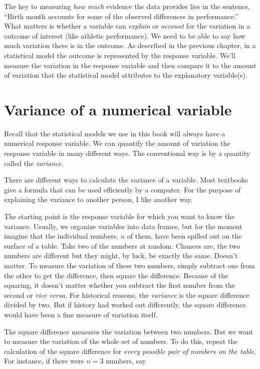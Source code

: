 \documentclass[]{tufte-book}
\begin{document}
The key to measuring \emph{how much} evidence the data provides lies in the sentence, ``Birth month accounts for some of the observed differences in performance.'' What matters is whether a variable can \emph{explain} or \emph{account} for the variation in a outcome of interest (like athletic performance). We need to be able to say how much variation there is in the outcome. As described in the previous chapter, in a statistical model the outcome is represented by the response variable. We'll measure the variation in the response variable and then compare it to the amount of variation that the statistical model attributes to the explanatory variable(s).

\hypertarget{variance-of-a-numerical-variable}{%
\section{Variance of a numerical variable}\label{variance-of-a-numerical-variable}}

Recall that the statistical models we use in this book will always have a numerical response variable. We can quantify the amount of variation the response variable in many different ways. The conventional way is by a quantity called the \emph{variance}.

There are different ways to calculate the variance of a variable. Most textbooks give a formula that can be used efficiently by a computer. For the purpose of explaining the variance to another person, I like another way.

The starting point is the response variable for which you want to know the variance. Usually, we organize variables into data frames, but for the moment imagine that the individual numbers, \(n\) of them, have been spilled out on the surface of a table. Take two of the numbers at random. Chances are, the two numbers are different but they might, by luck, be exactly the same. Doesn't matter. To measure the variation of these two numbers, simply subtract one from the other to get the difference, then square the difference. Because of the squaring, it doesn't matter whether you subtract the first number from the second or \emph{vice versa}. For historical reasons, the \emph{variance} is the square difference divided by two. But if history had worked out differently, the square difference would have been a fine measure of variation itself.

The square difference measures the variation between two numbers. But we want to measure the variation of the whole set of numbers. To do this, repeat the calculation of the square difference for \emph{every possible pair of numbers on the table}. For instance, if there were \(n=3\) numbers, say
\end{document}
